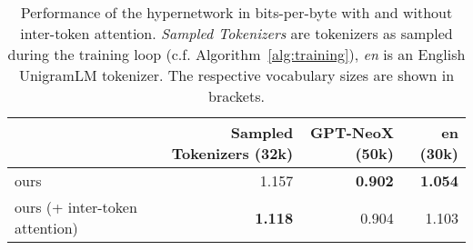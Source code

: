\begin{table}[!h]
\setlength{\aboverulesep}{0pt}
\setlength{\belowrulesep}{0pt}
\setlength{\extrarowheight}{.25ex}

\caption{Performance of the hypernetwork in bits-per-byte with and without inter-token attention. \textit{Sampled Tokenizers} are tokenizers as sampled during the training loop (c.f. Algorithm~\ref{alg:training}), \textit{en} is an English UnigramLM tokenizer. The respective vocabulary sizes are shown in brackets.}
\centering
\small
\begin{tabular}{lrrr}
\toprule
& \textbf{Sampled Tokenizers (32k)} & \textbf{GPT-NeoX (50k)} & \textbf{en (30k)}\\
\midrule
ours & 1.157 & \textbf{0.902} & \textbf{1.054}\\
ours (+ inter-token attention) & \textbf{1.118} & 0.904 & 1.103\\
\bottomrule
\end{tabular}
\label{table:non_amortizing}
\end{table}